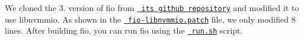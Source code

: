 We cloned the 3. version of fio from \href{https://github.com/axboe/fio/tree/ac694f66968fe7b18c820468abd8333f3df333fb}{\texttt{ its github repository}} and modified it to use libnvmmio. As shown in the \href{fio-libnvmmio.patch}{\texttt{ fio-\/libnvmmio.\+patch}} file, we only modified 8 lines. After building fio, you can run fio using the \href{run.sh}{\texttt{ run.\+sh}} script. 